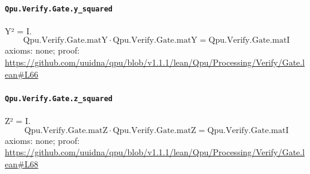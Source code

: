 \documentclass[11pt]{article}
\begin{document}
\paragraph{\texttt{Qpu.Verify.Gate.y\_squared}}
Y² = I.
\[ \mathrm{Qpu.Verify.Gate.matY} \cdot \mathrm{Qpu.Verify.Gate.matY} = \mathrm{Qpu.Verify.Gate.matI} \]
\noindent axioms: none; proof: \url{https://github.com/uuidna/qpu/blob/v1.1.1/lean/Qpu/Processing/Verify/Gate.lean\#L66}

\paragraph{\texttt{Qpu.Verify.Gate.z\_squared}}
Z² = I.
\[ \mathrm{Qpu.Verify.Gate.matZ} \cdot \mathrm{Qpu.Verify.Gate.matZ} = \mathrm{Qpu.Verify.Gate.matI} \]
\noindent axioms: none; proof: \url{https://github.com/uuidna/qpu/blob/v1.1.1/lean/Qpu/Processing/Verify/Gate.lean\#L68}
\end{document}
